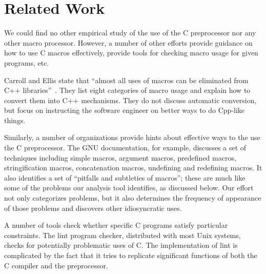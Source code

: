 \documentclass[11pt]{article}
\begin{document}

\section{Related Work}
\label{sec:related}

We could find no other empirical study of the use of the C preprocessor nor
any other macro processor.  However, a number of other efforts provide
guidance on how to use C macros effectively, provide tools for
checking macro usage for given programs, etc.

Carroll and Ellis state that ``almost all uses of macros can be
eliminated from C++ libraries''~\cite[p.~146]{Carroll95}. 
They list eight categories of macro usage and explain how to convert
them into C++ mechanisms.  They do not
discuss automatic conversion, but  focus on instructing the
software engineer on better ways to do Cpp-like things.

Similarly, a number of organizations provide hints about effective
ways to the use the C preprocessor.  The GNU documentation, for example,
discusses a set of techniques including simple macros, argument
macros, predefined macros, stringification macros, concatenation
macros, undefining and redefining
macros.
It also identifies a set of ``pitfalls and subtleties of
macros''; these are much like some of the problems our analysis tool
identifies, as discussed below.  Our effort not only categorizes
problems, but it also determines the frequency of appearance of those
problems and discovers other idiosyncratic uses.

A number of tools check whether specific C programs
satisfy particular constraints.  The lint program checker, distributed
with most Unix systems, checks for potentially problematic uses of C\@.
The implementation of lint is complicated by the fact
that it tries to replicate significant functions of both the C
compiler and the preprocessor.
\end{document}
